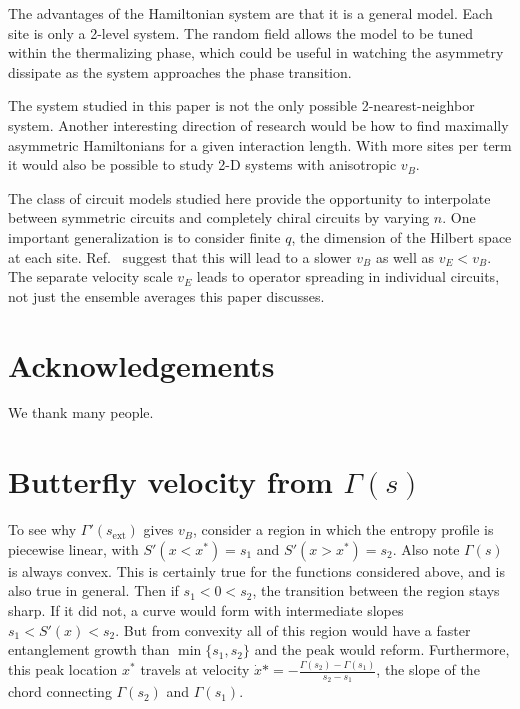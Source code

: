 \documentclass[aps,prx,reprint,superscriptaddress, longbibliography]{revtex4-1}
\newcommand{\charlie}[1]{{\color{Magenta}{{#1}}}}
\begin{document}
The advantages of the Hamiltonian system are that it is a general model. Each site is only a 2-level system. The random field allows the model to be tuned within the thermalizing phase, which could be useful in watching the asymmetry dissipate as the system approaches the phase transition. 

The system studied in this paper is not the only possible 2-nearest-neighbor system. Another interesting direction of research would be how to find maximally asymmetric Hamiltonians for a given interaction length. With more sites per term it would also be possible to study 2-D systems with anisotropic $v_B$.

The class of circuit models studied here provide the opportunity to interpolate between symmetric circuits and completely chiral circuits by varying $n$. One important generalization is to consider finite $q$, the dimension of the Hilbert space at each site. Ref.~\cite{KeyserlingkHydro} suggest that this will lead to a slower $v_B$ as well as $v_E<v_B$. The separate velocity scale $v_E$ leads to operator spreading in individual circuits, not just the ensemble averages this paper discusses.


\section*{Acknowledgements}
We thank many people.

\charlie{Note somewhere about arXiv:1809.02614v1}

\appendix

\section{Butterfly velocity from $\Gamma(s)$}

To see why $\Gamma'(s_\text{ext})$ gives $v_B$, consider a region in which the entropy profile is piecewise linear, with $S'(x<x^*)=s_1$ and $S'(x>x^*)=s_2$. Also note $\Gamma(s)$ is always convex. This is certainly true for the functions considered above, and is also true in general. Then if $s_1<0<s_2$, the transition between the region stays sharp. If it did not, a curve would form with intermediate slopes $s_1<S'(x)<s_2$. But from convexity all of this region would have a faster entanglement growth than $\min\{s_1,s_2\}$ and the peak would reform. Furthermore, this peak location $x^*$ travels at velocity $\dot{x}*=-\frac{\Gamma(s_2)-\Gamma(s_1)}{s_2-s_1}$, the slope of the chord connecting $\Gamma(s_2)$ and $\Gamma(s_1)$.
\end{document}
